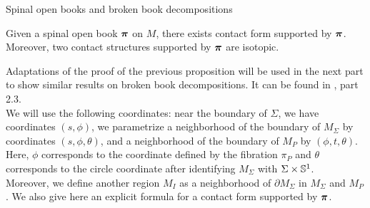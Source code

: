 \documentclass[../main.tex]{subfiles}
\begin{document}
\begin{section}{Spinal open books and broken book decompositions}
\begin{proposition}\label{prop:contact_structure_SOBD}
Given a spinal open book $\boldsymbol{\pi}$ on $M$, there exists contact form supported by $\boldsymbol{\pi}$. Moreover, two contact structures supported by $\boldsymbol{\pi}$ are isotopic.
\end{proposition}

Adaptations of the proof of the previous proposition will be used in the next part to show similar results on broken book decompositions. It can be found in \cite{SOBD1}, part 2.3.\\

We will use the following coordinates: near the boundary of $\Sigma$, we have coordinates $(s,\phi)$, we parametrize a neighborhood of the boundary of $M_\Sigma$ by coordinates $(s,\phi,\theta)$, and a neighborhood of the boundary of $M_P$ by $(\phi,t,\theta)$. Here, $\phi$ corresponds to the coordinate defined by the fibration $\pi_P$ and $\theta$ corresponds to the circle coordinate after identifying $M_\Sigma$ with $\Sigma\times \mathbb{S}^1$.\\

Moreover, we define another region $M_I$ as a neighborhood of $\partial M_\Sigma$ in $M_\Sigma$ and $M_P$.
We also give here an explicit formula for a contact form supported by $\boldsymbol{\pi}$.


\end{section}
\end{document}
